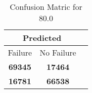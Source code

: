 \begin{table}[] 
\caption{Confusion Matric for 80.0} 
\label{Table: Prediction Accuracy-DMD80.0OnlySunEKF-ignoreReflection10.9EKF-top2-Reflection} 
\centering 
\begin{tabular} 
 {@{}ccc@{}} 
\toprule 
\multicolumn{2}{c}{\textbf{Predicted}}
 \\ \midrule 
\multicolumn{1}{|c|}{Failure} & 
\multicolumn{1}{c|}{No Failure}
 \\ \midrule 
\multicolumn{1}{|c|}{\color{green}\textbf{69345}} & 
\multicolumn{1}{c|}{\color{red}\textbf{17464}}
 \\ \midrule 
\multicolumn{1}{|c|}{\color{red}\textbf{16781}} & 
\multicolumn{1}{c|}{\color{green}\textbf{66538}}
 \\ \bottomrule 
\end{tabular} 
\end{table} 
